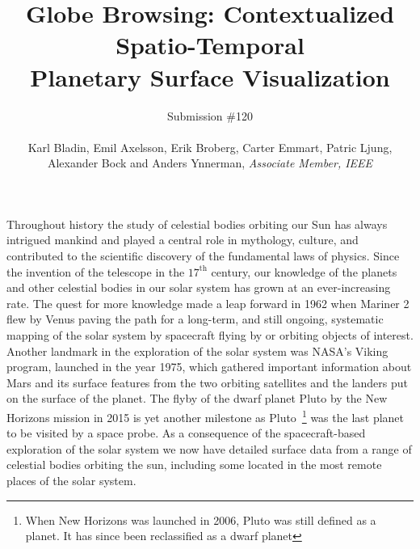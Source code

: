 \documentclass[journal]{vgtc}                %
\title{Globe Browsing: Contextualized Spatio-Temporal \\
Planetary Surface Visualization}
\author{Submission \#120 \\
\\
Karl Bladin, Emil Axelsson, Erik Broberg, Carter Emmart, Patric Ljung, \\ Alexander Bock and Anders Ynnerman, \textit{Associate Member, IEEE}}
\newcommand{\kallecomment}[1]{\textbf{[-Kalle-~}
    \textcolor{orange}{#1}
    \textbf{~]}}
\newcommand{\emilcomment}[1]{\textbf{[-Emil-~}
    \textcolor{red}{#1}
    \textbf{~]}}
\newcommand{\alexcomment}[1]{\textbf{[-Alex-~}
    \textcolor{magenta}{#1}
    \textbf{~]}}
\begin{document}

 \label{sec:introduction}
\maketitle


Throughout history the study of celestial bodies orbiting our Sun has always intrigued mankind and played a central role in mythology, culture, and contributed to the scientific discovery of the fundamental laws of physics.
Since the invention of the telescope in the $17^{\textrm{th}}$ century, our knowledge of the planets and other celestial bodies in our solar system has grown at an ever-increasing rate.
The quest for more knowledge made a leap forward in 1962 when Mariner 2 flew by Venus paving the path for a long-term, and still ongoing, systematic mapping of the solar system by spacecraft flying by or orbiting objects of interest.
Another landmark in the exploration of the solar system was NASA's Viking program, launched in the year 1975, which gathered important information about Mars and its surface features from the two orbiting satellites and the landers put on the surface of the planet.
The flyby of the dwarf planet Pluto by the New Horizons mission in 2015 is yet another milestone as Pluto~\footnote{When New Horizons was launched in 2006, Pluto was still defined as a planet. It has since been reclassified as a dwarf planet} was the last planet to be visited by a space probe. As a consequence of the spacecraft-based exploration of the solar system we now have detailed surface data from a range of celestial bodies orbiting the sun, including some located in the most remote places of the solar system. 
\end{document}
